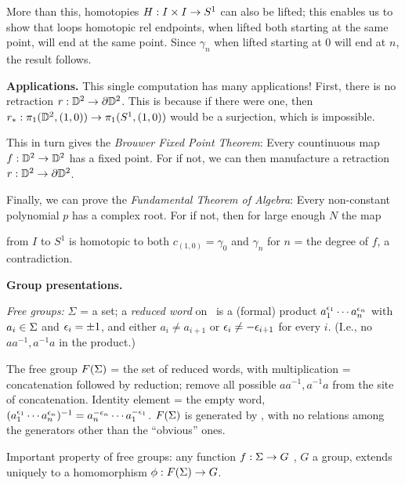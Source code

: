 \documentclass[12pt]{article}
\begin{document}
\ssk

More than this, homotopies $H:I\times I\rightarrow S^1$ can also be lifted; this enables us to
show that loops homotopic rel endpoints, when lifted both starting at the same point,
will end at the same point. Since $\gamma_n$ when lifted starting at $0$ will
end at $n$, the result follows.

\msk

{\bf Applications.}
This single computation has many applications! First, there is no
retraction $r:{\mathbb D}^2\rightarrow \partial{\mathbb D}^2$. This is because if there were one,
then $r_*:\pi_1({\mathbb D}^2,(1,0))\rightarrow\pi_1(S^1,(1,0))$ would be a surjection,
which is impossible.

\ssk

This in turn gives the {\it Brouwer Fixed Point Theorem}: Every countinuous
map $f:{\mathbb D}^2\rightarrow {\mathbb D}^2$ has a fixed point. For if not, we can then 
manufacture a retraction $r:{\mathbb D}^2\rightarrow \partial{\mathbb D}^2$.

\ssk

Finally, we can prove the {\it Fundamental Theorem of Algebra}: Every non-constant
polynomial $p$ has a complex root. For if not, then for large enough $N$ the map


from 
$I$ to $S^1$ is homotopic to both $c_{(1,0)}=\gamma_0$ and $\gamma_n$ for $n$ = the
degree of $f$, a contradiction.

\bsk

{\bf Group presentations.}

{\it Free groups:} $\Sigma$ = a set; a {\it reduced word} on \msig\ is a (formal)
product $a_1^{\epsilon_1}\cdots a_n^{\epsilon_n}$ with $a_i\in\Sigma$ and $\epsilon_i=\pm 1$,
and either $a_i\neq a_{i+1}$ or $\epsilon_i\neq -\epsilon_{i+1}$ for every $i$. (I.e., no
$aa^{-1},a^{-1}a$ in the product.)

\ssk

The free group $F(\Sigma)$ = the set of reduced words, with multiplication = concatenation 
followed by reduction; remove all possible $aa^{-1},a^{-1}a$ from the site of concatenation.
Identity element = the empty word, 
$(a_1^{\epsilon_1}\cdots a_n^{\epsilon_n})^{-1} = a_n^{-\epsilon_n}\cdots a_1^{-\epsilon_1}$. 
$F(\Sigma)$ is generated by \msig, with no relations among the generators
other than the ``obvious'' ones.

\ssk

Important property of free groups: any function $f:\Sigma\rightarrow G$ , $G$ a group, extends
uniquely to a homomorphism $\phi: F(\Sigma)\rightarrow G$.
\end{document}
